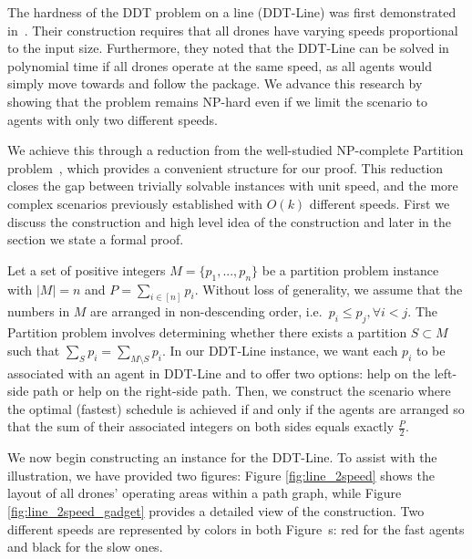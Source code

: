 The hardness of the DDT problem on a line (DDT-Line) was first demonstrated in~\cite{erlebach:drones}. Their construction requires that all drones have varying speeds proportional to the input size.  Furthermore, they noted that the DDT-Line can be solved in polynomial time if all drones operate at the same speed, as all agents would simply move towards and follow the package. 
We advance this research by showing that the problem remains NP-hard even if we limit the scenario to agents with only two different speeds. 

\thmline*

We achieve this through a reduction from the well-studied NP-complete Partition problem~\cite{garey1979computers}, which provides a convenient structure for our proof. This reduction closes the gap between trivially solvable instances with unit speed, and the more complex scenarios previously established with $O(k)$ different speeds. First we discuss the construction and high level idea of the construction and later in the section we state a formal proof.

Let a set of positive integers $M= \{p_1,...,p_n\}$ be a partition problem instance with $ |M|= n$ and $P=\sum_{i\in [n]} p_i$. Without loss of generality, we assume that the numbers in $M$ are arranged in non-descending order, i.e.\ $p_i\leq p_j, \forall i<j$. The Partition problem involves determining whether there exists a partition $S\subset M$ such that $\sum_{S}p_i=\sum_{M\setminus S}p_i$.  In our DDT-Line instance, 
 we want each $p_i$ to be associated with an agent in DDT-Line and to offer two options: help on the left-side path or help on the right-side path. Then, we construct the scenario where the optimal (fastest) schedule is achieved if and only if the agents are arranged so that the sum of their associated integers 
on both sides equals exactly $\frac{P}{2}$. 

We now begin constructing an instance for the DDT-Line.    
To assist with the illustration, we have provided two figures:  
Figure \ref{fig:line_2speed} shows the layout of all drones' operating areas within a path graph, while Figure \ref{fig:line_2speed_gadget} provides a detailed view of the construction. Two different speeds are represented by colors in both Figure~s: red for the fast agents and black for the slow ones.    

